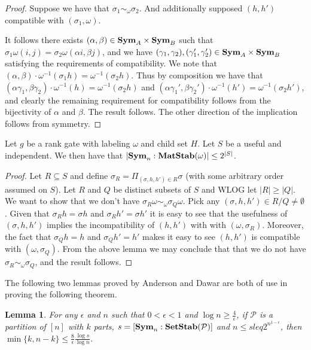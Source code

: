 \documentclass[12pt]{report}
\newtheorem{lem}[thm]{Lemma} \newtheorem{prop}[thm]{Proposition}
\newcommand{\setstab}{\text{\textbf{SetStab}}}
\newcommand{\matstab}{\text{\textbf{MatStab}}}
\newcommand{\sym}{\text{\textbf{Sym}}}
\begin{document}
\begin{proof}
  Suppose we have that $\sigma_1 \sim_\omega \sigma_2$. And additionally
  supposed $(h, h')$ compatible with $(\sigma_1, \omega)$.

  It follows there exists $(\alpha, \beta) \in \sym_A \times \sym_B$ such that
  $\sigma_1 \omega (i,j) = \sigma_2\omega (\alpha i, \beta j)$, and we have
  $(\gamma_1, \gamma_2), (\gamma_1', \gamma_2') \in \sym_A \times \sym_B$
  satisfying the requirements of compatibility. We note that $(\alpha, \beta)
  \cdot \omega^{-1}(\sigma_1 h) = \omega^{-1}(\sigma_2 h)$. Thus by composition
  we have that $(\alpha \gamma_1, \beta \gamma_2) \cdot \omega^{-1}(h) =
  \omega^{-1}(\sigma_2 h)$ and $(\alpha \gamma_1', \beta \gamma_2') \cdot
  \omega^{-1}(h') = \omega^{-1}(\sigma_2 h')$, and clearly the remaining
  requirement for compatibility follows from the bijectivity of $\alpha$ and
  $\beta$. The result follows. The other direction of the implication follows
  from symmetry.
\end{proof}

\begin{claim}
  \label{claim:useful-independant-set}
  Let $g$ be a rank gate with labeling $\omega$ and child set $H$. Let $S$ be a
  useful and independent. We then have that $\vert \sym_n: \matstab(\omega)
  \vert \leq 2^{\vert S \vert}$.
\end{claim}

\begin{proof}
  Let $R \subseteq S$ and define $\sigma_R = \Pi_{(\sigma, h, h') \in R} \sigma$
  (with some arbitrary order assumed on $S$). Let $R$ and $Q$ be distinct
  subsets of $S$ and WLOG let $\vert R \vert \geq \vert Q \vert$. We want to
  show that we don't have $\sigma_R \omega \sim_\omega \sigma_Q \omega$. Pick
  any $(\sigma, h, h') \in R/Q \neq \emptyset$. Given that $\sigma_R h = \sigma
  h$ and $\sigma_R h' = \sigma h'$ it is easy to see that the usefulness of
  $(\sigma, h,h')$ implies the incompatibility of $(h,h')$ with with $(\omega,
  \sigma_R)$. Moreover, the fact that $\sigma_Q h = h$ and $\sigma_Q h' = h'$
  makes it easy to see $(h,h')$ is compatible with $(\omega, \sigma_Q)$. From
  the above lemma we may conclude that that we do not have $\sigma_R \sim_\omega
  \sigma_Q$, and the result follows.
\end{proof}

The following two lemmas proved by Anderson and Dawar \cite{} are both of use in
proving the following theorem.

\begin{lem}
  \label{lem:big-or-small}
  For any $\epsilon$ and $n$ such that $0 < \epsilon < 1$ and $\log n \geq
  \frac{4}{\epsilon}$, if $\mathcal{P}$ is a partition of $[n]$ with $k$ parts,
  $s = [\sym_n : \setstab (\mathcal{P})]$ and $n \leq s leq 2^{n^{1-\epsilon}}$,
  then $\min \{k, n-k\} \leq \frac{8}{\epsilon} \frac{\log s}{\log n}$.
\end{lem}
\end{document}
